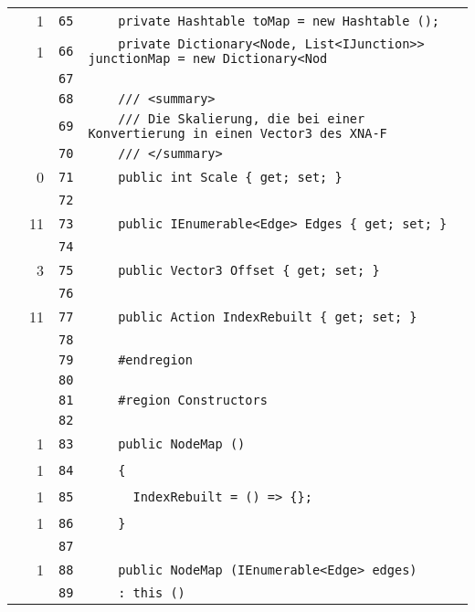 \documentclass[a4paper,10pt]{article}
\begin{document}
\begin{longtable}[l]{lrrl}
\cellcolor{green} & 1 & \verb~65~ & \verb~    private Hashtable toMap = new Hashtable ();~\\
\cellcolor{green} & 1 & \verb~66~ & \verb~    private Dictionary<Node, List<IJunction>> junctionMap = new Dictionary<Nod~\\
\cellcolor{gray} &  & \verb~67~ & \verb~~\\
\cellcolor{gray} &  & \verb~68~ & \verb~    /// <summary>~\\
\cellcolor{gray} &  & \verb~69~ & \verb~    /// Die Skalierung, die bei einer Konvertierung in einen Vector3 des XNA-F~\\
\cellcolor{gray} &  & \verb~70~ & \verb~    /// </summary>~\\
\cellcolor{red} & 0 & \verb~71~ & \verb~    public int Scale { get; set; }~\\
\cellcolor{gray} &  & \verb~72~ & \verb~~\\
\cellcolor{green} & 11 & \verb~73~ & \verb~    public IEnumerable<Edge> Edges { get; set; }~\\
\cellcolor{gray} &  & \verb~74~ & \verb~~\\
\cellcolor{green} & 3 & \verb~75~ & \verb~    public Vector3 Offset { get; set; }~\\
\cellcolor{gray} &  & \verb~76~ & \verb~~\\
\cellcolor{green} & 11 & \verb~77~ & \verb~    public Action IndexRebuilt { get; set; }~\\
\cellcolor{gray} &  & \verb~78~ & \verb~~\\
\cellcolor{gray} &  & \verb~79~ & \verb~    #endregion~\\
\cellcolor{gray} &  & \verb~80~ & \verb~~\\
\cellcolor{gray} &  & \verb~81~ & \verb~    #region Constructors~\\
\cellcolor{gray} &  & \verb~82~ & \verb~~\\
\cellcolor{green} & 1 & \verb~83~ & \verb~    public NodeMap ()~\\
\cellcolor{green} & 1 & \verb~84~ & \verb~    {~\\
\cellcolor{green} & 1 & \verb~85~ & \verb~      IndexRebuilt = () => {};~\\
\cellcolor{green} & 1 & \verb~86~ & \verb~    }~\\
\cellcolor{gray} &  & \verb~87~ & \verb~~\\
\cellcolor{green} & 1 & \verb~88~ & \verb~    public NodeMap (IEnumerable<Edge> edges)~\\
\cellcolor{gray} &  & \verb~89~ & \verb~    : this ()~\\

\end{longtable}
\end{document}
